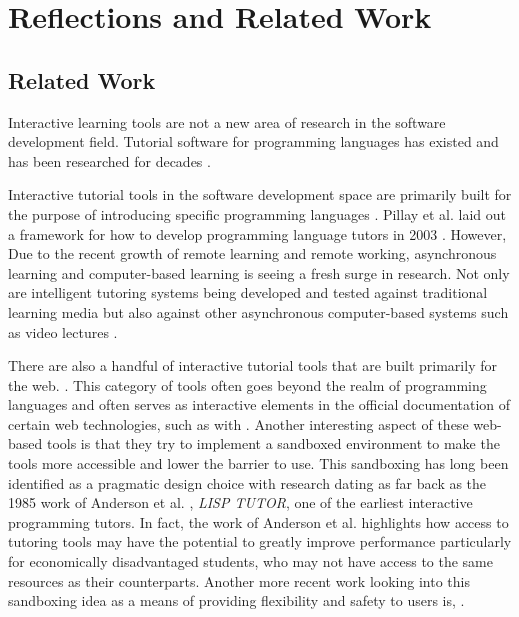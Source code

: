 \chapter{Reflections and Related Work}
\label{chap:reflection}
\section{Related Work}

Interactive learning tools are not a new area of research in the software
development field. Tutorial software for programming languages has existed  and
has been researched for decades \cite{anderson1985lisp,
	anderson1986automatedtutoring, gerdes2012interactive,
	permpool2019interactive, lee2005intelligent, jeuring2011programming,
	holland2009j,  schez2020intelligent}.

Interactive tutorial tools in the software development space are primarily
built for the purpose of introducing specific programming languages
\cite{donehaskell, holland2009j, ajayi2010development, lee2005intelligent}.
Pillay et al. laid out a framework for how to develop programming language
tutors in 2003 \cite{pillay2003developing}. However, Due to the recent growth
of remote learning and remote working, asynchronous learning and computer-based
learning is seeing a fresh surge in research. Not only are intelligent
tutoring systems being developed and tested against traditional learning media
but also against other asynchronous computer-based systems such as video lectures
\cite{becker201950, ossovski2022comparing}.

There are also a handful of interactive tutorial tools that are built primarily
for the web. \cite{donehaskell, harris_team, harris_team, herweijer,
lee2005intelligent}. This category of tools often goes beyond the realm of
programming languages and often serves as interactive elements in the official
documentation of certain web technologies, such as with
\cite{harris_team,team_meta}. Another interesting aspect of these web-based
tools is that they try to implement a sandboxed environment to make the tools
more accessible and lower the barrier to use. This sandboxing has long been
identified as a pragmatic design choice with research dating as far back as the
1985 work of Anderson et al. \cite{anderson1985lisp}, \textit{LISP TUTOR}, one
of the earliest interactive programming tutors. In fact, the work of Anderson
et al. highlights how access to tutoring tools may have the potential to
greatly improve performance particularly for economically disadvantaged
students, who may not have access to the same resources as their counterparts.
Another more recent work looking into this sandboxing idea as a means of
providing flexibility and safety to users is, \cite{permpool2019interactive}.


